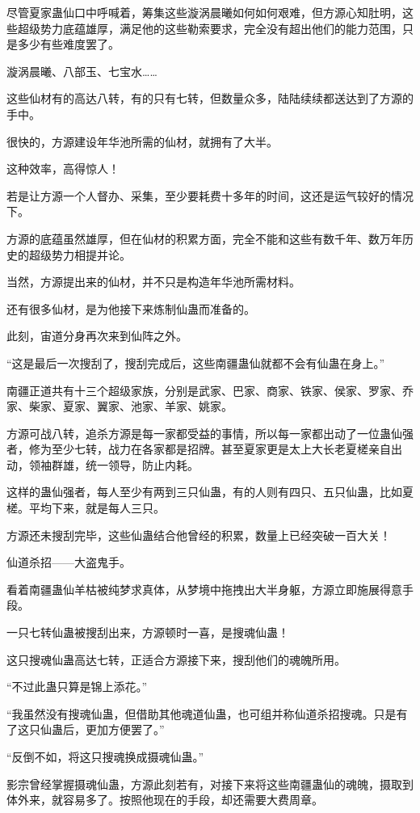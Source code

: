 \begin{this_body}
尽管夏家蛊仙口中呼喊着，筹集这些漩涡晨曦如何如何艰难，但方源心知肚明，这些超级势力底蕴雄厚，满足他的这些勒索要求，完全没有超出他们的能力范围，只是多少有些难度罢了。

漩涡晨曦、八部玉、七宝水……

这些仙材有的高达八转，有的只有七转，但数量众多，陆陆续续都送达到了方源的手中。

很快的，方源建设年华池所需的仙材，就拥有了大半。

这种效率，高得惊人！

若是让方源一个人督办、采集，至少要耗费十多年的时间，这还是运气较好的情况下。

方源的底蕴虽然雄厚，但在仙材的积累方面，完全不能和这些有数千年、数万年历史的超级势力相提并论。

当然，方源提出来的仙材，并不只是构造年华池所需材料。

还有很多仙材，是为他接下来炼制仙蛊而准备的。

此刻，宙道分身再次来到仙阵之外。

“这是最后一次搜刮了，搜刮完成后，这些南疆蛊仙就都不会有仙蛊在身上。”

南疆正道共有十三个超级家族，分别是武家、巴家、商家、铁家、侯家、罗家、乔家、柴家、夏家、翼家、池家、羊家、姚家。

方源可战八转，追杀方源是每一家都受益的事情，所以每一家都出动了一位蛊仙强者，修为至少七转，战力在各家都是招牌。甚至夏家更是太上大长老夏槎亲自出动，领袖群雄，统一领导，防止内耗。

这样的蛊仙强者，每人至少有两到三只仙蛊，有的人则有四只、五只仙蛊，比如夏槎。平均下来，就是每人三只。

方源还未搜刮完毕，这些仙蛊结合他曾经的积累，数量上已经突破一百大关！

仙道杀招——大盗鬼手。

看着南疆蛊仙羊枯被纯梦求真体，从梦境中拖拽出大半身躯，方源立即施展得意手段。

一只七转仙蛊被搜刮出来，方源顿时一喜，是搜魂仙蛊！

这只搜魂仙蛊高达七转，正适合方源接下来，搜刮他们的魂魄所用。

“不过此蛊只算是锦上添花。”

“我虽然没有搜魂仙蛊，但借助其他魂道仙蛊，也可组并称仙道杀招搜魂。只是有了这只仙蛊后，更加方便罢了。”

“反倒不如，将这只搜魂换成摄魂仙蛊。”

影宗曾经掌握摄魂仙蛊，方源此刻若有，对接下来将这些南疆蛊仙的魂魄，摄取到体外来，就容易多了。按照他现在的手段，却还需要大费周章。


\end{this_body}

